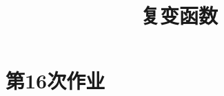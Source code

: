 \documentclass{../mynote}
\title{复变函数}
\begin{document}
\maketitle

\section{第16次作业}

\end{document}
